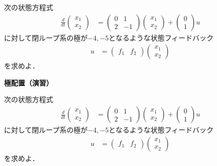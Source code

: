 \documentclass[a4paper,11pt,fleqn]{jreport}
\begin{document}
次の状態方程式
\begin{align*}
	\frac{d}{dt}
	\left (
	\begin{array}{c}
	 x_1 \\ x_2 
	\end{array}
	\right )
	& = 
	\left (
	\begin{array}{cc}
	 0 & 1 \\
	 2 & -1
	\end{array}
	\right )
	\left (
	\begin{array}{c}
	 x_1 \\ x_2 
	\end{array}
	\right )
	+
	\left (
	\begin{array}{c}
	 0 \\ 1 
	\end{array}
	\right )
	u
\end{align*}
に対して閉ループ系の極が$-4,-5$となるような状態フィードバック
\begin{align*}
	u 
	&=
	\left (
	\begin{array}{cc}
	 f_1 & f_2
	\end{array}
	\right )
	\left (
	\begin{array}{c}
	 x_1 \\ x_2 
	\end{array}
	\right )
\end{align*}
を求めよ．

\newpage

\noindent
{\bf 極配置（演習）}

次の状態方程式
\begin{align*}
	\frac{d}{dt}
	\left (
	\begin{array}{c}
	 x_1 \\ x_2 
	\end{array}
	\right )
	& = 
	\left (
	\begin{array}{cc}
	 0 & 1 \\
	 2 & -1
	\end{array}
	\right )
	\left (
	\begin{array}{c}
	 x_1 \\ x_2 
	\end{array}
	\right )
	+
	\left (
	\begin{array}{c}
	 0 \\ 1 
	\end{array}
	\right )
	u
\end{align*}
に対して閉ループ系の極が$-4,-5$となるような状態フィードバック
\begin{align*}
	u 
	&=
	\left (
	\begin{array}{cc}
	 f_1 & f_2
	\end{array}
	\right )
	\left (
	\begin{array}{c}
	 x_1 \\ x_2 
	\end{array}
	\right )
\end{align*}
を求めよ．
\\
\end{document}
